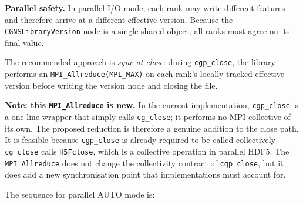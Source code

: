 \documentclass[11pt,letterpaper]{article}
\begin{document}
\textbf{Parallel safety.}  In parallel I/O mode, each rank may write
different features and therefore arrive at a different effective
version.  Because the \texttt{CGNSLibraryVersion} node is a single
shared object, all ranks must agree on its final value.

The recommended approach is \emph{sync-at-close}: during
\texttt{cgp\_close}, the library performs an
\texttt{MPI\_Allreduce(MPI\_MAX)} on each rank's locally tracked
effective version before writing the version node and closing the
file.

\textbf{Note: this \texttt{MPI\_Allreduce} is new.}  In the current
implementation, \texttt{cgp\_close} is a one-line wrapper that simply
calls \texttt{cg\_close}; it performs no MPI collective of its own.
The proposed reduction is therefore a genuine addition to the close
path.  It is feasible because \texttt{cgp\_close} is already required
to be called collectively---\texttt{cg\_close} calls
\texttt{H5Fclose}, which is a collective operation in parallel HDF5.
The \texttt{MPI\_Allreduce} does not change the collectivity contract
of \texttt{cgp\_close}, but it does add a new synchronisation point
that implementations must account for.

The sequence for parallel AUTO mode is:
\end{document}
